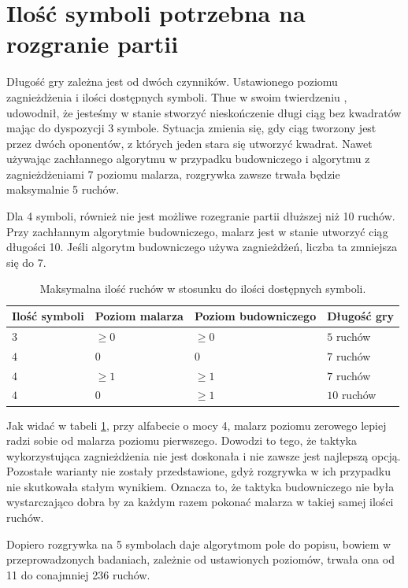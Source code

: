 \documentclass[document]{xmgr}
\begin{document}
\section{Ilość symboli potrzebna na rozgranie partii}
Długość gry zależna jest od dwóch czynników. Ustawionego poziomu zagnieżdżenia i ilości dostępnych symboli. Thue w swoim twierdzeniu \cite{repetition}, udowodnił, że jesteśmy w stanie stworzyć nieskończenie długi ciąg bez kwadratów mając do dyspozycji 3 symbole. Sytuacja zmienia się, gdy ciąg tworzony jest przez dwóch oponentów, z których jeden stara się utworzyć kwadrat. Nawet używając zachłannego algorytmu w przypadku budowniczego i algorytmu z zagnieżdżeniami 7 poziomu malarza, rozgrywka zawsze trwała będzie maksymalnie 5 ruchów. 

Dla 4 symboli, również nie jest możliwe rozegranie partii dłuższej niż 10 ruchów. Przy zachłannym algorytmie budowniczego, malarz jest w stanie utworzyć ciąg długości 10. Jeśli algorytm budowniczego używa zagnieżdżeń, liczba ta zmniejsza się do 7.

\begin{table}[tbh]
    \centering
	\begin{tabular}{|l|l|l|l|} \hline
	Ilość symboli & Poziom malarza & Poziom budowniczego & Długość gry \\ \hline
	$3$ & $\geq 0$ & $\geq 0$ & $5$ ruchów\\ \hline
	$4$ & $0$ & $0$ & $7$ ruchów\\ \hline
	$4$ & $\geq 1 $ & $\geq 1$ & $7$ ruchów\\ \hline
	$4$ & $0$ & $\geq 1$ & $10$ ruchów\\ \hline
	\end{tabular}
	\caption{Maksymalna ilość ruchów w stosunku do ilości dostępnych symboli.}
	\label{fig:maxGameLength}
\end{table}

Jak widać w tabeli \ref{fig:maxGameLength}, przy alfabecie o mocy 4, malarz poziomu zerowego lepiej radzi sobie  od malarza poziomu pierwszego. Dowodzi to tego, że taktyka wykorzystująca zagnieżdżenia nie jest doskonała i nie zawsze jest najlepszą opcją. Pozostałe warianty nie zostały przedstawione, gdyż rozgrywka w ich przypadku nie skutkowała stałym wynikiem. Oznacza to, że taktyka budowniczego nie była wystarczająco dobra by za każdym razem pokonać malarza w takiej samej ilości ruchów.


Dopiero rozgrywka na 5 symbolach daje algorytmom pole do popisu, bowiem w przeprowadzonych badaniach, zależnie od ustawionych poziomów, trwała ona od 11 do conajmniej 236 ruchów.
\end{document}
